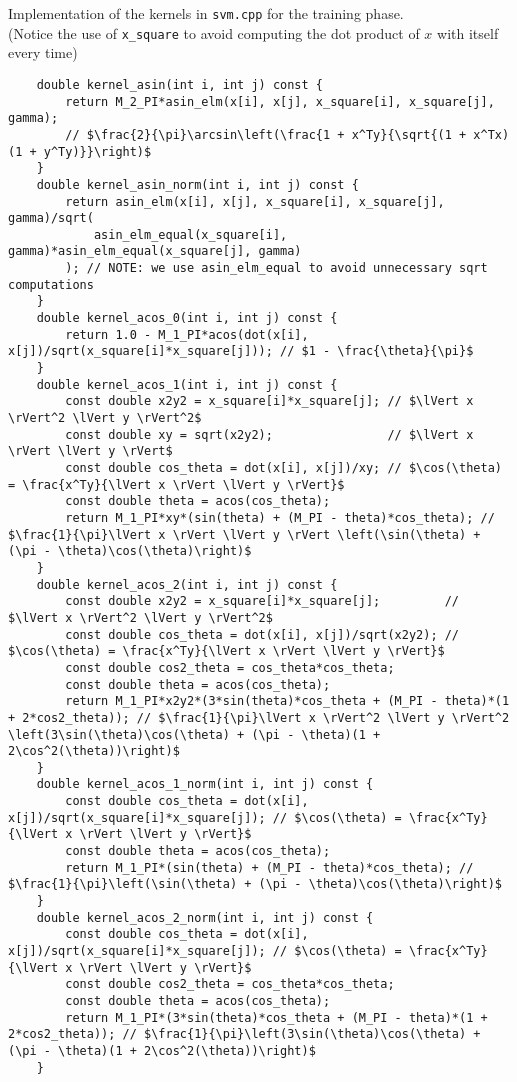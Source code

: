 \begin{listing}
    \caption{Implementation of the kernels in \texttt{svm.cpp} for the training phase. \\[0.5em]
        (Notice the use of \texttt{x\_square} to avoid computing the dot product of $x$ with itself every time)
    }
    \label{lst:kernel_function}
    \begin{verbatim}
    double kernel_asin(int i, int j) const {
        return M_2_PI*asin_elm(x[i], x[j], x_square[i], x_square[j], gamma);
        // $\frac{2}{\pi}\arcsin\left(\frac{1 + x^Ty}{\sqrt{(1 + x^Tx)(1 + y^Ty)}}\right)$
    }
    double kernel_asin_norm(int i, int j) const {
        return asin_elm(x[i], x[j], x_square[i], x_square[j], gamma)/sqrt(
            asin_elm_equal(x_square[i], gamma)*asin_elm_equal(x_square[j], gamma)
        ); // NOTE: we use asin_elm_equal to avoid unnecessary sqrt computations
    }
    double kernel_acos_0(int i, int j) const {
        return 1.0 - M_1_PI*acos(dot(x[i], x[j])/sqrt(x_square[i]*x_square[j])); // $1 - \frac{\theta}{\pi}$
    }
    double kernel_acos_1(int i, int j) const {
        const double x2y2 = x_square[i]*x_square[j]; // $\lVert x \rVert^2 \lVert y \rVert^2$
        const double xy = sqrt(x2y2);                // $\lVert x \rVert \lVert y \rVert$
        const double cos_theta = dot(x[i], x[j])/xy; // $\cos(\theta) = \frac{x^Ty}{\lVert x \rVert \lVert y \rVert}$
        const double theta = acos(cos_theta);
        return M_1_PI*xy*(sin(theta) + (M_PI - theta)*cos_theta); // $\frac{1}{\pi}\lVert x \rVert \lVert y \rVert \left(\sin(\theta) + (\pi - \theta)\cos(\theta)\right)$
    }
    double kernel_acos_2(int i, int j) const {
        const double x2y2 = x_square[i]*x_square[j];         // $\lVert x \rVert^2 \lVert y \rVert^2$
        const double cos_theta = dot(x[i], x[j])/sqrt(x2y2); // $\cos(\theta) = \frac{x^Ty}{\lVert x \rVert \lVert y \rVert}$
        const double cos2_theta = cos_theta*cos_theta;
        const double theta = acos(cos_theta);
        return M_1_PI*x2y2*(3*sin(theta)*cos_theta + (M_PI - theta)*(1 + 2*cos2_theta)); // $\frac{1}{\pi}\lVert x \rVert^2 \lVert y \rVert^2 \left(3\sin(\theta)\cos(\theta) + (\pi - \theta)(1 + 2\cos^2(\theta))\right)$
    }
    double kernel_acos_1_norm(int i, int j) const {
        const double cos_theta = dot(x[i], x[j])/sqrt(x_square[i]*x_square[j]); // $\cos(\theta) = \frac{x^Ty}{\lVert x \rVert \lVert y \rVert}$
        const double theta = acos(cos_theta);
        return M_1_PI*(sin(theta) + (M_PI - theta)*cos_theta); // $\frac{1}{\pi}\left(\sin(\theta) + (\pi - \theta)\cos(\theta)\right)$
    }
    double kernel_acos_2_norm(int i, int j) const {
        const double cos_theta = dot(x[i], x[j])/sqrt(x_square[i]*x_square[j]); // $\cos(\theta) = \frac{x^Ty}{\lVert x \rVert \lVert y \rVert}$
        const double cos2_theta = cos_theta*cos_theta;
        const double theta = acos(cos_theta);
        return M_1_PI*(3*sin(theta)*cos_theta + (M_PI - theta)*(1 + 2*cos2_theta)); // $\frac{1}{\pi}\left(3\sin(\theta)\cos(\theta) + (\pi - \theta)(1 + 2\cos^2(\theta))\right)$
    }
\end{verbatim}
\end{listing}


